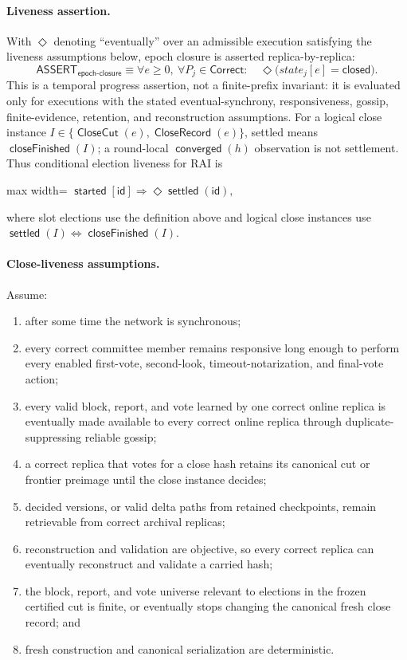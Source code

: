 \documentclass[sigplan,twocolumn,review,anonymous]{acmart}
\newcommand{\func}[1]{\operatorname{\mathsf{#1}}}
\newcommand{\id}{\mathsf{id}}
\newcommand{\CloseCut}{\func{CloseCut}}
\newcommand{\CloseRecord}{\func{CloseRecord}}
\newcommand{\closeFinished}{\func{closeFinished}}
\newcommand{\started}{\func{started}}
\newcommand{\converged}{\func{converged}}
\begin{document}
\paragraph{Liveness assertion.}
With \(\Diamond\) denoting ``eventually'' over an admissible execution satisfying the liveness
assumptions below, epoch closure is asserted replica-by-replica:
\[
\mathsf{ASSERT}_{\mathsf{epoch\mbox{-}closure}}\equiv
\forall e\ge0,\ \forall P_j\in\mathsf{Correct}:\quad
\Diamond\bigl(state_j[e]=\mathsf{closed}\bigr).
\]
This is a temporal progress assertion, not a finite-prefix invariant: it is evaluated only for
executions with the stated eventual-synchrony, responsiveness, gossip, finite-evidence, retention, and
reconstruction assumptions.
For a logical close instance \(I\in\{\CloseCut(e),\CloseRecord(e)\}\), settled means
\(\closeFinished(I)\); a round-local \(\converged(h)\) observation is not settlement.  Thus
conditional election liveness for RAI is
\begin{center}
\begin{adjustbox}{max width=\columnwidth}
\(\displaystyle
\started[\id]\Rightarrow \Diamond\func{settled}(\id),
\)
\end{adjustbox}
\end{center}
where slot elections use the definition above and logical close instances use
\(\func{settled}(I)\iff\closeFinished(I)\).

\paragraph{Close-liveness assumptions.}
Assume:

\begin{enumerate}
\item after some time the network is synchronous;
\item every correct committee member remains responsive long enough to perform every enabled
      first-vote, second-look, timeout-notarization, and final-vote action;
\item every valid block, report, and vote learned by one correct online replica is eventually made
      available to every correct online replica through duplicate-suppressing reliable gossip;
\item a correct replica that votes for a close hash retains its canonical cut or frontier preimage until
      the close instance decides;
\item decided versions, or valid delta paths from retained checkpoints, remain retrievable from correct
      archival replicas;
\item reconstruction and validation are objective, so every correct replica can eventually reconstruct
      and validate a carried hash;
\item the block, report, and vote universe relevant to elections in the frozen certified cut is finite,
      or eventually stops changing the canonical fresh close record; and
\item fresh construction and canonical serialization are deterministic.
\end{enumerate}
\end{document}
